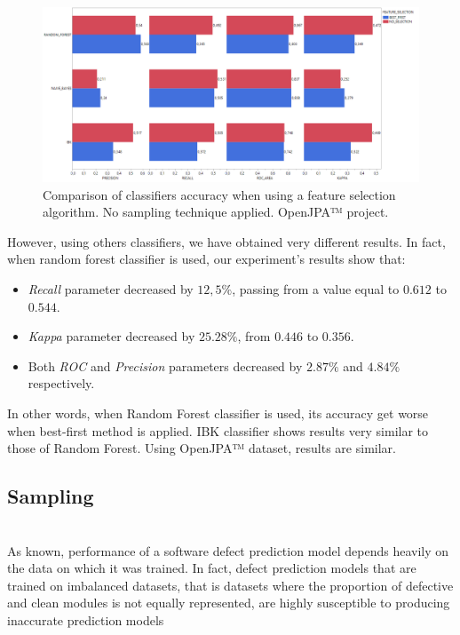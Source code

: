 \documentclass[sigconf]{acmart}
\begin{document}
\begin{figure}[h!]
  \centering
  \includegraphics[width=\textwidth]{./OPENJPA/FeatureSelection.png}
  \caption{Comparison of classifiers accuracy when using a feature selection algorithm. No sampling technique applied. OpenJPA™ project.}
  \label{OPENJPA-FeatureSelection}
\end{figure}

However, using others classifiers, we have obtained very different results. In fact, when random forest classifier is used, our experiment's results show that: 

\begin{itemize}
\item \textit{Recall} parameter decreased by $12,5\%$, passing from a value equal to $0.612$ to $0.544$. 
\item \textit{Kappa} parameter decreased by $25.28\%$, from $0.446$ to $0.356$. 
\item Both \textit{ROC} and \textit{Precision} parameters decreased by $2.87\%$ and $4.84\%$ respectively.
\end{itemize}

In other words, when Random Forest classifier is used, its accuracy get worse when best-first method is applied. IBK classifier shows results very similar to those of Random Forest. Using OpenJPA™ dataset, results are similar. 

\FloatBarrier

\subsection{Sampling}
\hfill\\

As known, performance of a software defect prediction model depends heavily on the data on which it was trained. In fact, defect prediction models that are trained on imbalanced datasets, that is datasets where the proportion of defective and clean modules is not equally represented, are highly susceptible to producing inaccurate prediction models \cite{FalessiSampling}
\end{document}
